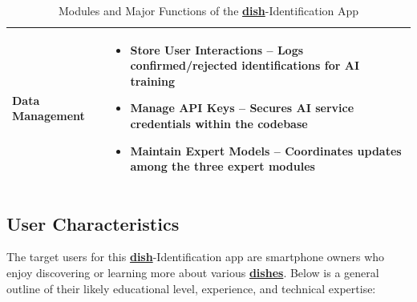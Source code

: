 \documentclass[]{article}
\begin{document}
\begin{table}[H]
\begin{tabular}{|p{4cm}|p{10cm}|}
\hline
\textbf{Data Management} &
\begin{itemize}
    \item \textbf{Store User Interactions} – Logs confirmed/rejected identifications for AI training
    \item \textbf{Manage API Keys} – Secures AI service credentials within the codebase
    \item \textbf{Maintain Expert Models} – Coordinates updates among the three expert modules
\end{itemize} \\
\hline
\end{tabular}
\caption{Modules and Major Functions of the \hyperref[Dish]{\textbf{dish}}-Identification App}
\label{tab:dish-functions}
\end{table}

\subsection{User Characteristics}
\label{sub:user_characteristics}

The target users for this \hyperref[Dish]{\textbf{dish}}-Identification app are smartphone owners who enjoy discovering or learning more about various \hyperref[Dish]{\textbf{dishes}}. Below is a general outline of their likely educational level, experience, and technical expertise:
\end{document}
